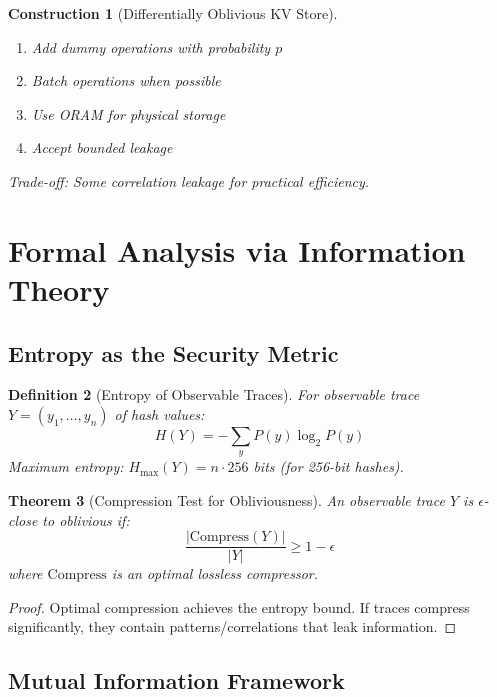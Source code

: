 \documentclass[11pt,final]{article}
\newtheorem{theorem}{Theorem}[section]
\newtheorem{definition}[theorem]{Definition}
\newtheorem{construction}[theorem]{Construction}
\begin{document}
\begin{construction}[Differentially Oblivious KV Store]
\begin{enumerate}
    \item Add dummy operations with probability $p$
    \item Batch operations when possible
    \item Use ORAM for physical storage
    \item Accept bounded leakage
\end{enumerate}
Trade-off: Some correlation leakage for practical efficiency.
\end{construction}

\section{Formal Analysis via Information Theory}

\subsection{Entropy as the Security Metric}

\begin{definition}[Entropy of Observable Traces]
For observable trace $Y = (y_1, \ldots, y_n)$ of hash values:
\begin{equation}
H(Y) = -\sum_{y} P(y) \log_2 P(y)
\end{equation}
Maximum entropy: $H_{\max}(Y) = n \cdot 256$ bits (for 256-bit hashes).
\end{definition}

\begin{theorem}[Compression Test for Obliviousness]
An observable trace $Y$ is $\epsilon$-close to oblivious if:
\begin{equation}
\frac{|\text{Compress}(Y)|}{|Y|} \geq 1 - \epsilon
\end{equation}
where $\text{Compress}$ is an optimal lossless compressor.
\end{theorem}

\begin{proof}
Optimal compression achieves the entropy bound. If traces compress significantly, they contain patterns/correlations that leak information.
\end{proof}

\subsection{Mutual Information Framework}
\end{document}

